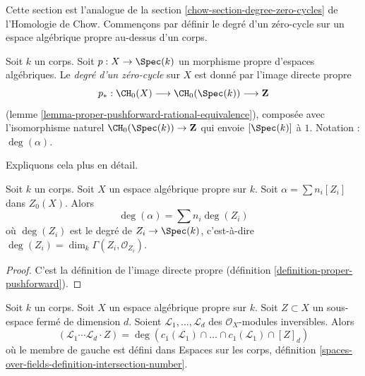 \noindent
Cette section est l'analogue de la section
\ref{chow-section-degree-zero-cycles} de l'Homologie de Chow. Commençons par
définir le degré d'un zéro-cycle sur un espace algébrique propre au-dessus d'un
corps.

\begin{definition}
\label{definition-degree-zero-cycle}
Soit $k$ un corps. Soit $p : X \to \Spec(k)$ un morphisme propre d'espaces
algébriques. Le {\it degré d'un zéro-cycle} sur $X$ est donné par l'image
directe propre
$$
p_* : \CH_0(X) \longrightarrow \CH_0(\Spec(k)) \longrightarrow \mathbf{Z}
$$
(lemme \ref{lemma-proper-pushforward-rational-equivalence}), composée avec
l'isomorphisme naturel $\CH_0(\Spec(k)) \to \mathbf{Z}$ qui envoie $[\Spec(k)]$
à $1$. Notation : $\deg(\alpha)$.
\end{definition}

\noindent
Expliquons cela plus en détail.

\begin{lemma}
\label{lemma-spell-out-degree-zero-cycle}
Soit $k$ un corps. Soit $X$ un espace algébrique propre sur $k$. Soit $\alpha
= \sum n_i[Z_i]$ dans $Z_0(X)$. Alors
$$
\deg(\alpha) = \sum n_i\deg(Z_i)
$$
où $\deg(Z_i)$ est le degré de $Z_i \to \Spec(k)$, c'est-à-dire $\deg(Z_i) =
\dim_k \Gamma(Z_i, \mathcal{O}_{Z_i})$.
\end{lemma}

\begin{proof}
C'est la définition de l'image directe propre (définition
\ref{definition-proper-pushforward}).
\end{proof}

\begin{lemma}
\label{lemma-degrees-and-numerical-intersections}
Soit $k$ un corps. Soit $X$ un espace algébrique propre sur $k$. Soit $Z
\subset X$ un sous-espace fermé de dimension $d$. Soient $\mathcal{L}_1,
\ldots, \mathcal{L}_d$ des $\mathcal{O}_X$-modules inversibles. Alors
$$
(\mathcal{L}_1 \cdots \mathcal{L}_d \cdot Z) =
\deg(
c_1(\mathcal{L}_1) \cap \ldots \cap c_1(\mathcal{L}_1) \cap [Z]_d)
$$
où le membre de gauche est défini dans Espaces sur les corps, définition
\ref{spaces-over-fields-definition-intersection-number}.
\end{lemma}

